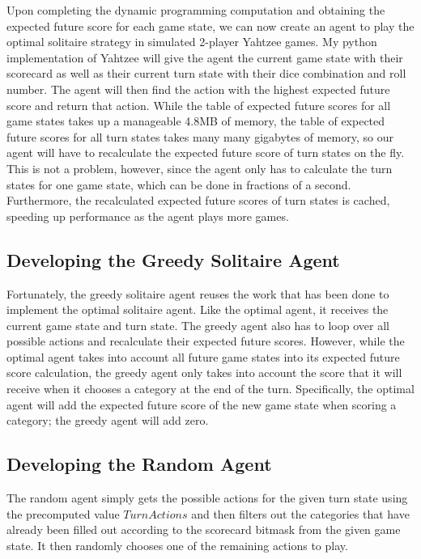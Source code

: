 \documentclass[12pt]{article}
\begin{document}
\noindent
Upon completing the dynamic programming computation and obtaining the expected future score for each game state, we can now create an agent to play the optimal solitaire strategy in simulated 2-player Yahtzee games. My python implementation of Yahtzee will give the agent the current game state with their scorecard as well as their current turn state with their dice combination and roll number. The agent will then find the action with the highest expected future score and return that action. While the table of expected future scores for all game states takes up a manageable 4.8MB of memory, the table of expected future scores for all turn states takes many many gigabytes of memory, so our agent will have to recalculate the expected future score of turn states on the fly. This is not a problem, however, since the agent only has to calculate the turn states for one game state, which can be done in fractions of a second. Furthermore, the recalculated expected future scores of turn states is cached, speeding up performance as the agent plays more games.

\subsection{Developing the Greedy Solitaire Agent}
Fortunately, the greedy solitaire agent reuses the work that has been done to implement the optimal solitaire agent. Like the optimal agent, it receives the current game state and turn state. The greedy agent also has to loop over all possible actions and recalculate their expected future scores. However, while the optimal agent takes into account all future game states into its expected future score calculation, the greedy agent only takes into account the score that it will receive when it chooses a category at the end of the turn. Specifically, the optimal agent will add the expected future score of the new game state when scoring a category; the greedy agent will add zero.

\subsection{Developing the Random Agent}
The random agent simply gets the possible actions for the given turn state using the precomputed value $TurnActions$ and then filters out the categories that have already been filled out according to the scorecard bitmask from the given game state. It then randomly chooses one of the remaining actions to play.
\end{document}
